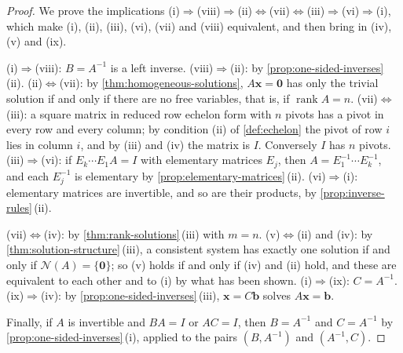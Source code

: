 \begin{proof}
We prove the implications (i)$\Rightarrow$(viii)$\Rightarrow$(ii)$\Leftrightarrow$(vii)$\Leftrightarrow$(iii)$\Rightarrow$(vi)$\Rightarrow$(i), which make (i), (ii), (iii), (vi), (vii) and (viii) equivalent, and then bring in (iv), (v) and (ix).

(i)$\Rightarrow$(viii): $B=A^{-1}$ is a left inverse. (viii)$\Rightarrow$(ii): by \cref{prop:one-sided-inverses}\,(ii). (ii)$\Leftrightarrow$(vii): by \cref{thm:homogeneous-solutions}, $A\mathbf x=\mathbf 0$ has only the trivial solution if and only if there are no free variables, that is, if $\operatorname{rank}A=n$. (vii)$\Leftrightarrow$(iii): a square matrix in reduced row echelon form with $n$ pivots has a pivot in every row and every column; by condition (ii) of \cref{def:echelon} the pivot of row $i$ lies in column $i$, and by (iii) and (iv) the matrix is $I$. Conversely $I$ has $n$ pivots. (iii)$\Rightarrow$(vi): if $E_k\cdots E_1A=I$ with elementary matrices $E_j$, then $A=E_1^{-1}\cdots E_k^{-1}$, and each $E_j^{-1}$ is elementary by \cref{prop:elementary-matrices}\,(ii). (vi)$\Rightarrow$(i): elementary matrices are invertible, and so are their products, by \cref{prop:inverse-rules}\,(ii).

(vii)$\Leftrightarrow$(iv): by \cref{thm:rank-solutions}\,(iii) with $m=n$. (v)$\Leftrightarrow$(ii) and (iv): by \cref{thm:solution-structure}\,(iii), a consistent system has exactly one solution if and only if $\mathcal N(A)=\{\mathbf 0\}$; so (v) holds if and only if (iv) and (ii) hold, and these are equivalent to each other and to (i) by what has been shown. (i)$\Rightarrow$(ix): $C=A^{-1}$. (ix)$\Rightarrow$(iv): by \cref{prop:one-sided-inverses}\,(iii), $\mathbf x=C\mathbf b$ solves $A\mathbf x=\mathbf b$.

Finally, if $A$ is invertible and $BA=I$ or $AC=I$, then $B=A^{-1}$ and $C=A^{-1}$ by \cref{prop:one-sided-inverses}\,(i), applied to the pairs $(B,A^{-1})$ and $(A^{-1},C)$.
\end{proof}

